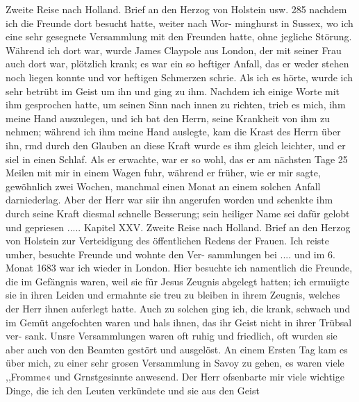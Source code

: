 Zweite Reise nach Holland. Brief an den Herzog von Holstein usw. 285
nachdem ich die Freunde dort besucht hatte, weiter nach Wor-
minghurst in Sussex, wo ich eine sehr gesegnete Versammlung
mit den Freunden hatte, ohne jegliche Störung. Während ich
dort war, wurde James Claypole aus London, der mit seiner
Frau auch dort war, plötzlich krank; es war ein so heftiger Anfall,
das er weder stehen noch liegen konnte und vor heftigen Schmerzen
schrie. Als ich es hörte, wurde ich sehr betrübt im Geist um ihn
und ging zu ihm. Nachdem ich einige Worte mit ihm gesprochen
hatte, um seinen Sinn nach innen zu richten, trieb es mich, ihm
meine Hand auszulegen, und ich bat den Herrn, seine Krankheit
von ihm zu nehmen; während ich ihm meine Hand auslegte, kam
die Krast des Herrn über ihn, rmd durch den Glauben an diese
Kraft wurde es ihm gleich leichter, und er siel in einen Schlaf.
Als er erwachte, war er so wohl, das er am nächsten Tage
25 Meilen mit mir in einem Wagen fuhr, während er früher,
wie er mir sagte, gewöhnlich zwei Wochen, manchmal einen
Monat an einem solchen Anfall darniederlag. Aber der Herr
war siir ihn angerufen worden und schenkte ihm durch seine Kraft
diesmal schnelle Besserung; sein heiliger Name sei dafür gelobt
und gepriesen .....
Kapitel XXV.
Zweite Reise nach Holland. Brief an den Herzog von Holstein
zur Verteidigung des öffentlichen Redens der Frauen.
Ich reiste umher, besuchte Freunde und wohnte den Ver-
sammlungen bei .... und im 6. Monat 1683 war ich wieder
in London. Hier besuchte ich namentlich die Freunde, die im
Gefängnis waren, weil sie für Jesus Zeugnis abgelegt hatten;
ich ermuiigte sie in ihren Leiden und ermahnte sie treu zu bleiben
in ihrem Zeugnis, welches der Herr ihnen auferlegt hatte. Auch
zu solchen ging ich, die krank, schwach und im Gemüt angefochten
waren und hals ihnen, das ihr Geist nicht in ihrer Trübsal ver-
sank. Unsre Versammlungen waren oft ruhig und friedlich, oft
wurden sie aber auch von den Beamten gestört und ausgelöst.
An einem Ersten Tag kam es über mich, zu einer sehr grosen
Versammlung in Savoy zu gehen, es waren viele ,,Fromme« und
Grnstgesinnte anwesend. Der Herr ofsenbarte mir viele wichtige
Dinge, die ich den Leuten verkündete und sie aus den Geist


